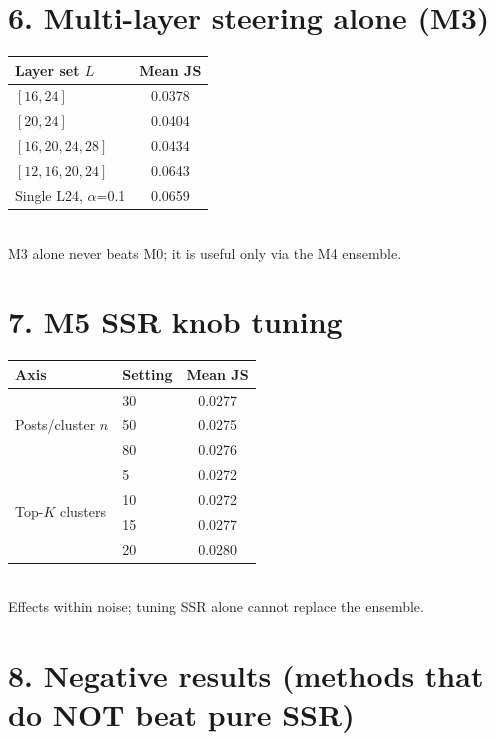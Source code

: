 \documentclass[10pt,a4paper]{article}
\begin{document}
\vspace{10pt}

\begin{minipage}[t]{0.48\textwidth}
\section*{6. Multi-layer steering alone (M3)}
\centering\small
\begin{tabular}{@{}lc@{}}
\toprule
Layer set $L$ & Mean JS \\
\midrule
$[16, 24]$              & 0.0378 \\
$[20, 24]$              & 0.0404 \\
$[16, 20, 24, 28]$      & 0.0434 \\
$[12, 16, 20, 24]$      & 0.0643 \\
\rowcolor{badrow} Single L24, $\alpha$=0.1 & 0.0659 \\
\bottomrule
\end{tabular}
\\[2pt]
{\footnotesize M3 alone never beats M0; it is useful only via the M4 ensemble.}
\end{minipage}
\hfill
\begin{minipage}[t]{0.48\textwidth}
\section*{7. M5 SSR knob tuning}
\centering\small
\begin{tabular}{@{}llc@{}}
\toprule
Axis & Setting & Mean JS \\
\midrule
\multirow{3}{*}{Posts/cluster $n$} & 30 & 0.0277 \\
 & 50 & 0.0275 \\
 & 80 & 0.0276 \\
\midrule
\multirow{4}{*}{Top-$K$ clusters} & 5  & 0.0272 \\
 & 10 & 0.0272 \\
 & 15 & 0.0277 \\
 & 20 & 0.0280 \\
\bottomrule
\end{tabular}
\\[2pt]
{\footnotesize Effects within noise; tuning SSR alone cannot replace the ensemble.}
\end{minipage}

\vspace{10pt}

\section*{8. Negative results (methods that do NOT beat pure SSR)}
\end{document}
